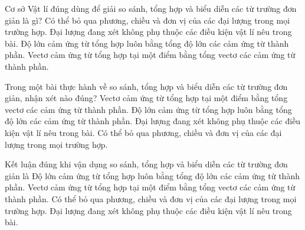\begin{ex}
Cơ sở Vật lí đúng dùng để giải so sánh, tổng hợp và biểu diễn các từ trường đơn giản là gì?
\choice
{Có thể bỏ qua phương, chiều và đơn vị của các đại lượng trong mọi trường hợp.}
{Đại lượng đang xét không phụ thuộc các điều kiện vật lí nêu trong bài.}
{Độ lớn cảm ứng từ tổng hợp luôn bằng tổng độ lớn các cảm ứng từ thành phần.}
{\True Vectơ cảm ứng từ tổng hợp tại một điểm bằng tổng vectơ các cảm ứng từ thành phần.}
\end{ex}

\begin{ex}
Trong một bài thực hành về so sánh, tổng hợp và biểu diễn các từ trường đơn giản, nhận xét nào đúng?
\choice
{\True Vectơ cảm ứng từ tổng hợp tại một điểm bằng tổng vectơ các cảm ứng từ thành phần.}
{Độ lớn cảm ứng từ tổng hợp luôn bằng tổng độ lớn các cảm ứng từ thành phần.}
{Đại lượng đang xét không phụ thuộc các điều kiện vật lí nêu trong bài.}
{Có thể bỏ qua phương, chiều và đơn vị của các đại lượng trong mọi trường hợp.}
\end{ex}

\begin{ex}
Kết luận đúng khi vận dụng so sánh, tổng hợp và biểu diễn các từ trường đơn giản là
\choice
{Độ lớn cảm ứng từ tổng hợp luôn bằng tổng độ lớn các cảm ứng từ thành phần.}
{\True Vectơ cảm ứng từ tổng hợp tại một điểm bằng tổng vectơ các cảm ứng từ thành phần.}
{Có thể bỏ qua phương, chiều và đơn vị của các đại lượng trong mọi trường hợp.}
{Đại lượng đang xét không phụ thuộc các điều kiện vật lí nêu trong bài.}
\end{ex}

